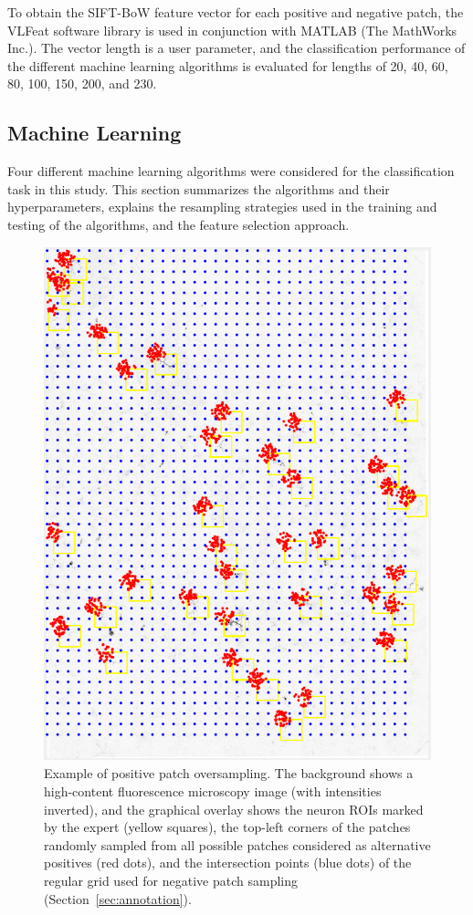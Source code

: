 To obtain the SIFT-BoW feature vector for each positive and negative patch, the VLFeat software library \cite{vedaldi2010vlfeat} is used in conjunction with MATLAB (The MathWorks Inc.). The vector length is a user parameter, and the classification performance of the different machine learning algorithms is evaluated for lengths of 20, 40, 60, 80, 100, 150, 200, and 230.

\subsection{Machine Learning}
\label{subsec:machineLearning}
Four different machine learning algorithms were considered for the classification task in this study. This section summarizes the algorithms and their hyperparameters, explains the resampling strategies used in the training and testing of the algorithms, and the feature selection approach.
\begin{figure}[h!]
	\centering
	\includegraphics[width=0.8\columnwidth]{fig03}
	\caption{Example of positive patch oversampling. The background shows a high-content fluorescence microscopy image (with intensities inverted), and the graphical overlay shows the neuron ROIs marked by the expert (yellow squares), the top-left corners of the patches randomly sampled from all possible patches considered as alternative positives (red dots), and the intersection points (blue dots) of the regular grid used for negative patch sampling (Section~\ref{sec:annotation}).}
	\label{ch5_fig3}
\end{figure}

